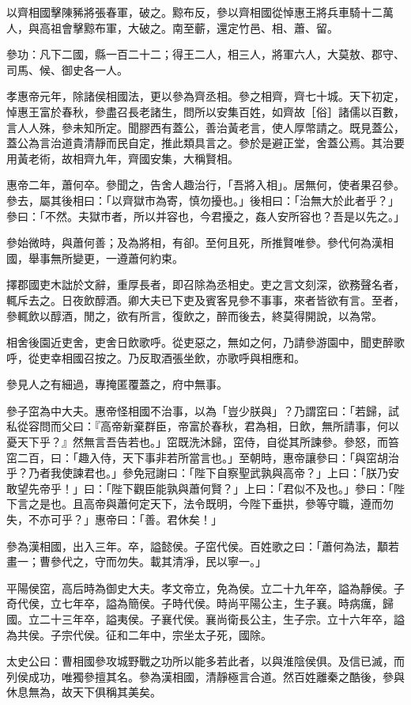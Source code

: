 \begin{pinyinscope}
以齊相國擊陳豨將張春軍，破之。黥布反，參以齊相國從悼惠王將兵車騎十二萬人，與高祖會擊黥布軍，大破之。南至蘄，還定竹邑、相、蕭、留。

參功：凡下二國，縣一百二十二；得王二人，相三人，將軍六人，大莫敖、郡守、司馬、候、御史各一人。

孝惠帝元年，除諸侯相國法，更以參為齊丞相。參之相齊，齊七十城。天下初定，悼惠王富於春秋，參盡召長老諸生，問所以安集百姓，如齊故［俗］諸儒以百數，言人人殊，參未知所定。聞膠西有蓋公，善治黃老言，使人厚幣請之。既見蓋公，蓋公為言治道貴清靜而民自定，推此類具言之。參於是避正堂，舍蓋公焉。其治要用黃老術，故相齊九年，齊國安集，大稱賢相。

惠帝二年，蕭何卒。參聞之，告舍人趣治行，「吾將入相」。居無何，使者果召參。參去，屬其後相曰：「以齊獄市為寄，慎勿擾也。」後相曰：「治無大於此者乎？」參曰：「不然。夫獄市者，所以并容也，今君擾之，姦人安所容也？吾是以先之。」

參始微時，與蕭何善；及為將相，有卻。至何且死，所推賢唯參。參代何為漢相國，舉事無所變更，一遵蕭何約束。

擇郡國吏木詘於文辭，重厚長者，即召除為丞相史。吏之言文刻深，欲務聲名者，輒斥去之。日夜飲醇酒。卿大夫已下吏及賓客見參不事事，來者皆欲有言。至者，參輒飲以醇酒，閒之，欲有所言，復飲之，醉而後去，終莫得開說，以為常。

相舍後園近吏舍，吏舍日飲歌呼。從吏惡之，無如之何，乃請參游園中，聞吏醉歌呼，從吏幸相國召按之。乃反取酒張坐飲，亦歌呼與相應和。

參見人之有細過，專掩匿覆蓋之，府中無事。

參子窋為中大夫。惠帝怪相國不治事，以為「豈少朕與」？乃謂窋曰：「若歸，試私從容問而父曰：『高帝新棄群臣，帝富於春秋，君為相，日飲，無所請事，何以憂天下乎？』然無言吾告若也。」窋既洗沐歸，窋侍，自從其所諫參。參怒，而笞窋二百，曰：「趣入侍，天下事非若所當言也。」至朝時，惠帝讓參曰：「與窋胡治乎？乃者我使諫君也。」參免冠謝曰：「陛下自察聖武孰與高帝？」上曰：「朕乃安敢望先帝乎！」曰：「陛下觀臣能孰與蕭何賢？」上曰：「君似不及也。」參曰：「陛下言之是也。且高帝與蕭何定天下，法令既明，今陛下垂拱，參等守職，遵而勿失，不亦可乎？」惠帝曰：「善。君休矣！」

參為漢相國，出入三年。卒，謚懿侯。子窋代侯。百姓歌之曰：「蕭何為法，顜若畫一；曹參代之，守而勿失。載其清凈，民以寧一。」

平陽侯窋，高后時為御史大夫。孝文帝立，免為侯。立二十九年卒，謚為靜侯。子奇代侯，立七年卒，謚為簡侯。子時代侯。時尚平陽公主，生子襄。時病癘，歸國。立二十三年卒，謚夷侯。子襄代侯。襄尚衛長公主，生子宗。立十六年卒，謚為共侯。子宗代侯。征和二年中，宗坐太子死，國除。

太史公曰：曹相國參攻城野戰之功所以能多若此者，以與淮陰侯俱。及信已滅，而列侯成功，唯獨參擅其名。參為漢相國，清靜極言合道。然百姓離秦之酷後，參與休息無為，故天下俱稱其美矣。


\end{pinyinscope}
